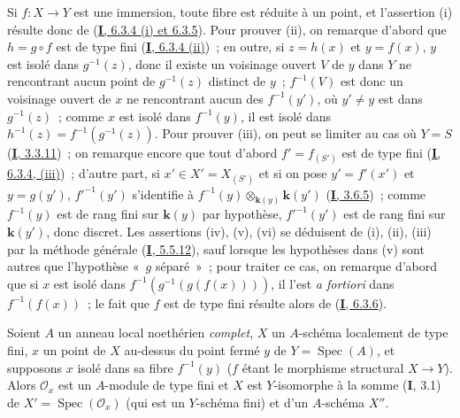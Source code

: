 Si $f:X\to Y$ est une immersion, toute fibre est réduite à un point, et
l'assertion (i) résulte donc de (\hyperref[I.6.3.4-fr]{\textbf{I}, 6.3.4 (i) et
6.3.5}). Pour prouver (ii), on remarque d'abord que $h=g\circ f$ est de type
fini (\hyperref[I.6.3.4-fr]{\textbf{I}, 6.3.4 (ii)})~; en outre, si $z=h(x)$ et
$y=f(x)$, $y$ est isolé dans $g^{-1}(z)$, donc il existe un voisinage ouvert
$V$ de $y$ dans $Y$ ne rencontrant aucun point de $g^{-1}(z)$ distinct de
$y$~; $f^{-1}(V)$ est donc un voisinage ouvert de $x$ ne rencontrant aucun
des $f^{-1}(y')$, où $y'\neq y$ est dans $g^{-1}(z)$~; comme $x$ est isolé
dans $f^{-1}(y)$, il est isolé dans
$h^{-1}(z)=f^{-1}(g^{-1}(z))$. Pour prouver (iii), on peut se limiter au cas
où $Y=S$ (\hyperref[I.3.3.11-fr]{\textbf{I}, 3.3.11})~; on remarque encore que tout
d'abord $f'=f_{(S')}$ est de type fini
(\hyperref[I.6.3.4-fr]{\textbf{I}, 6.3.4, (iii)})~; d'autre part, si
$x'\in X'=X_{(S')}$ et si on pose $y'=f'(x')$ et $y=g(y')$,
$f'^{-1}(y')$ s'identifie à
$f^{-1}(y)\otimes_{\boldsymbol{k}(y)}\boldsymbol{k}(y')$ (\hyperref[I.3.6.5-fr]{\textbf{I}, 3.6.5})~; comme
$f^{-1}(y)$ est de rang fini sur $\boldsymbol{k}(y)$ par hypothèse, $f'^{-1}(y')$ est de
rang fini sur $\boldsymbol{k}(y')$, donc discret. Les assertions (iv), (v), (vi) se
déduisent de (i), (ii), (iii) par la méthode générale
(\hyperref[I.5.5.12-fr]{\textbf{I}, 5.5.12}), sauf lorsque les hypothèses dans (v) sont
autres que l'hypothèse «~$g$ séparé~»~; pour traiter ce cas, on remarque
d'abord que si $x$ est isolé dans
$f^{-1}(g^{-1}(g(f(x))))$, il l'est \emph{a fortiori} dans $f^{-1}(f(x))$~; le fait
que $f$ est de type fini résulte alors de
(\hyperref[I.6.3.6-fr]{\textbf{I}, 6.3.6}).

\begin{proposition}[6.2.5]
\label{II.6.2.5-fr}
Soient $A$ un anneau local noethérien \emph{complet}, $X$ un $A$-schéma localement
de type fini, $x$ un point de $X$ au-dessus du point fermé $y$ de
$Y=\operatorname{Spec}(A)$, et supposons $x$ isolé dans sa fibre
$f^{-1}(y)$ ($f$ étant le morphisme structural $X\to Y$). Alors
$\mathcal{O}_x$ est un $A$-module de type fini et $X$ est $Y$-isomorphe à la
somme \textup{(\textbf{I}, 3.1)} de
$X'=\operatorname{Spec}(\mathcal{O}_x)$ (qui est un $Y$-schéma fini) et d'un
$A$-schéma $X''$.
\end{proposition}

